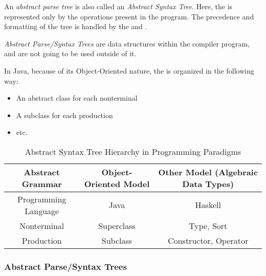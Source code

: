 \begin{definition}\label{def:Abstract_Parse_Tree}
  An \emph{abstract parse tree} is also called an \emph{Abstract Syntax Tree}.
  Here, the  is represented only by the operations present in the program.
  The precedence and formatting of the tree is handled by the  and .

  \emph{Abstract Parse/Syntax Trees} are data structures within the compiler program, and are not going to be used outside of it.

  \begin{remark}\label{rmk:Abstract_Syntax_Tree_in_Java}
    In Java, because of its Object-Oriented nature, the  is organized in the following way:
    \begin{itemize}[noitemsep]
    \item An abstract class for each nonterminal
    \item A subclass for each production
    \item etc.
    \end{itemize}
  \end{remark}
\end{definition}

\begin{table}[h!]
  \centering
  \begin{tabular}{ccc}
    \toprule
    \textbf{Abstract Grammar} & \textbf{Object-Oriented Model} & \textbf{Other Model} (Algebraic Data Types) \\
    \midrule
    Programming Language & Java & Haskell \\
    Nonterminal & Superclass & Type, Sort \\
    Production & Subclass & Constructor, Operator \\
    \bottomrule
  \end{tabular}
  \caption{Abstract Syntax Tree Hierarchy in Programming Paradigms}
  \label{tab:Abstract_Syntax_Tree_Programming_Paradigms}
\end{table}
\subsubsection{Abstract Parse/Syntax Trees}\label{subsubsec:Abstract_Parse_Trees}


